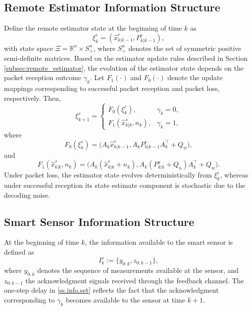 \documentclass[letterpaper, 10 pt, conference]{ieeeconf}
\begin{document}
\subsection{Remote Estimator Information Structure}\label{subsec.RE.info}
Define the remote estimator state at the beginning of time $k$ as
\begin{equation}\label{internal.state}
    \xi^e_k = (\hat{x}^{e}_{k|k-1}, P^{e}_{k|k-1}),
\end{equation}
with state space $\Xi = \mathbb{R}^{n} \times S_+^{n}$, where $S_+^{n}$ denotes the set of symmetric positive semi-definite matrices.
Based on the estimator update rules described in Section \ref{subsec:remote_estimator}, the evolution of the  estimator state depends on the packet reception outcome $\gamma_k$. Let $F_1(\cdot)$ and $F_0(\cdot)$ denote the  update mappings corresponding to  successful packet reception and packet loss, respectively. Then,  
\begin{equation}\label{info.state.xi.recursion}
    \xi^e_{k+1} = \begin{cases}
F_0(\xi_k^e), & \text{$\gamma_k=0$},\\[3pt]
F_1(\hat{x}^s_{k|k},n_k), & \text{$\gamma_k=1$},
\end{cases}
\end{equation}
where 
\begin{equation*}
    F_0(\xi_k^e) = \Big(A_k\hat{x}^e_{k|k-1}, A_kP^e_{k|k-1}A_k^\top+Q_w\Big),
\end{equation*}
and 
\begin{equation*}
    F_1(\hat{x}^s_{k|k},n_k) = \Big(A_k(\hat{x}^s_{k|k}+n_k), A_k(P^s_{k|k}+Q_n)A_k^\top+Q_w\Big).
\end{equation*}
Under packet loss, the estimator state evolves deterministically from $\xi_k^e$, whereas under successful reception its state estimate component is stochastic due to the decoding noise.


\subsection{Smart Sensor Information Structure}
\label{subsec:SS_Info}
At the beginning of time $k$, the information available to the smart sensor is defined as
\begin{equation}\label{ss.info.set}
    I_k^s := \{y_{0:k}, z_{0:k-1}\},
\end{equation}
where $y_{0:k}$ denotes the sequence of measurements available at the sensor, and $z_{0:k-1}$ the acknowledgment signals received through the feedback  channel. The one-step delay in \eqref{ss.info.set} reflects the fact that the acknowledgment corresponding to $\gamma_k$ becomes available to the sensor at time $k+1$.
\end{document}
